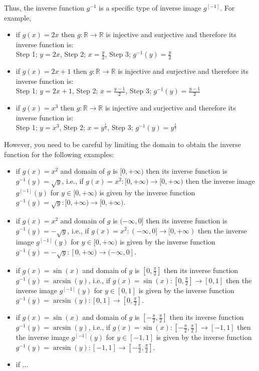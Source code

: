 Thus, the inverse function $g^{-1}$ is a specific type of inverse image $g^{[-1]}$.  
For example,
\begin{itemize}
\item if $g(x)=2x$ then $g:\mathbb{R} \to \mathbb{R}$ is injective and surjective and therefore its inverse function is:\\
{\sf Step 1;} $y=2x$, {\sf Step 2;} $x=\frac{y}{2}$, {\sf Step 3;} $g^{-1}(y)=\frac{y}{2}$
\item if $g(x)=2x+1$ then $g:\mathbb{R} \to \mathbb{R}$ is injective and surjective and therefore its inverse function is:\\
{\sf Step 1;} $y=2x+1$, {\sf Step 2;} $x=\frac{y-1}{2}$, {\sf Step 3;} $g^{-1}(y)=\frac{y-1}{2}$
\item if $g(x)=x^3$ then $g:\mathbb{R} \to \mathbb{R}$ is injective and surjective and therefore its inverse function is:\\
{\sf Step 1;} $y=x^3$, {\sf Step 2;} $x={y}^{\frac{1}{3}}$, {\sf Step 3;} $g^{-1}(y)={y}^{\frac{1}{3}}$
\end{itemize}
However, you need to be careful by limiting the domain to obtain the inverse function for the following examples:
\begin{itemize}
\item if $g(x)=x^2$ and domain of $g$ is $[0,+\infty)$ then its inverse function is $g^{-1}(y)=\sqrt{y}$, 
i.e., if $g(x)=x^2 : [0,+\infty) \to [0,+\infty)$ then the inverse image $g^{[-1]}(y)$ for $y \in [0,+\infty)$ is given by the inverse function $g^{-1}(y)=\sqrt{y} : [0,+\infty) \to [0,+\infty)$.
\item if $g(x)=x^2$ and domain of $g$ is $(-\infty,0]$ then its inverse function is $g^{-1}(y)=-\sqrt{y}$, 
i.e., if $g(x)=x^2 : (-\infty,0] \to [0,+\infty)$ then the inverse image $g^{[-1]}(y)$ for $y \in [0,+\infty)$ is given by the inverse function $g^{-1}(y)=-\sqrt{y} : [0,+\infty) \to (-\infty,0]$.
\item if $g(x)=\sin(x)$ and domain of $g$ is $[0,\frac{\pi}{2}]$ then its inverse function $g^{-1}(y)=\arcsin(y)$, i.e., if $g(x)=\sin(x) : [0,\frac{\pi}{2}] \to [0,1]$ then the inverse image $g^{[-1]}(y)$ for $y \in [0,1]$ is given by the inverse function $g^{-1}(y)=\arcsin(y) : [0,1] \to [0, \frac{\pi}{2}]$.
\item if $g(x)=\sin(x)$ and domain of $g$ is $[-\frac{\pi}{2},\frac{\pi}{2}]$ then its inverse function $g^{-1}(y)=\arcsin(y)$, i.e., if $g(x)=\sin(x) : [-\frac{\pi}{2},\frac{\pi}{2}] \to [-1,1]$ then the inverse image $g^{[-1]}(y)$ for $y \in [-1,1]$ is given by the inverse function $g^{-1}(y)=\arcsin(y) : [-1,1] \to [-\frac{\pi}{2},\frac{\pi}{2}]$.
\item if ... %
\end{itemize}
  
